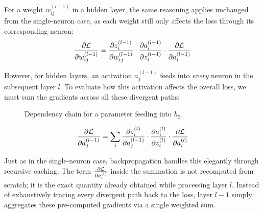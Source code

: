For a weight $w_{ij}^{(l-1)}$ in a hidden layer, the same reasoning applies unchanged from the single-neuron case, as each weight still only affects the loss through its corresponding neuron:
\begin{equation*}
    \frac{\partial \mathcal{L}}{\partial w_{ij}^{(l-1)}} = \frac{\partial z_i^{(l-1)}}{\partial w_{ij}^{(l-1)}} \cdot \frac{\partial a_i^{(l-1)}}{\partial z_i^{(l-1)}} \cdot \frac{\partial \mathcal{L}}{\partial a_i^{(l-1)}}
\end{equation*}

However, for hidden layers, an activation $a_j^{(l-1)}$ feeds into \textit{every} neuron in the subsequent layer $l$. To evaluate how this activation affects the overall loss, we must sum the gradients across all these divergent paths:

\begin{figure}[H]
    \centering
    \scalebox{0.5}{}
    \caption{Dependency chain for a parameter feeding into $h_2$.}
    \label{fig:backpropagation_output}
\end{figure}

\begin{equation*}
    \frac{\partial \mathcal{L}}{\partial a_j^{(l-1)}} = \sum_{i} \frac{\partial z_i^{(l)}}{\partial a_j^{(l-1)}} \cdot \frac{\partial a_i^{(l)}}{\partial z_i^{(l)}} \cdot \frac{\partial \mathcal{L}}{\partial a_i^{(l)}}
\end{equation*}

Just as in the single-neuron case, backpropagation handles this elegantly through recursive caching. The term $\frac{\partial \mathcal{L}}{\partial a_i^{(l)}}$ inside the summation is not recomputed from scratch; it is the exact quantity already obtained while processing layer $l$. Instead of exhaustively tracing every divergent path back to the loss, layer $l-1$ simply aggregates these pre-computed gradients via a single weighted sum.